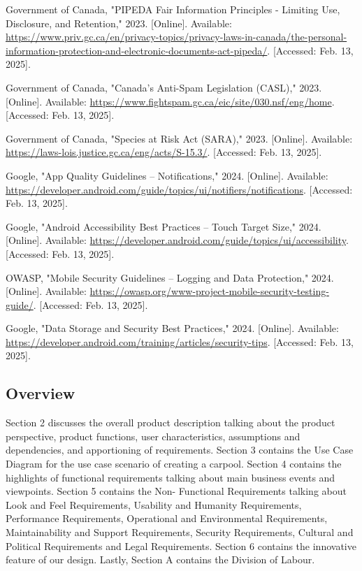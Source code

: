 \documentclass[]{article}
\begin{document}
\begin{thebibliography}{9}
     Government of Canada, "PIPEDA Fair Information Principles - Limiting Use, Disclosure, and Retention," 2023. [Online]. Available: \url{https://www.priv.gc.ca/en/privacy-topics/privacy-laws-in-canada/the-personal-information-protection-and-electronic-documents-act-pipeda/}. [Accessed: Feb. 13, 2025].

     Government of Canada, "Canada’s Anti-Spam Legislation (CASL)," 2023. [Online]. Available: \url{https://www.fightspam.gc.ca/eic/site/030.nsf/eng/home}. [Accessed: Feb. 13, 2025].

     Government of Canada, "Species at Risk Act (SARA)," 2023. [Online]. Available: \url{https://laws-lois.justice.gc.ca/eng/acts/S-15.3/}. [Accessed: Feb. 13, 2025].

     Google, "App Quality Guidelines – Notifications," 2024. [Online]. Available: \url{https://developer.android.com/guide/topics/ui/notifiers/notifications}. [Accessed: Feb. 13, 2025].

     Google, "Android Accessibility Best Practices – Touch Target Size," 2024. [Online]. Available: \url{https://developer.android.com/guide/topics/ui/accessibility}. [Accessed: Feb. 13, 2025].

     OWASP, "Mobile Security Guidelines – Logging and Data Protection," 2024. [Online]. Available: \url{https://owasp.org/www-project-mobile-security-testing-guide/}. [Accessed: Feb. 13, 2025].

     Google, "Data Storage and Security Best Practices," 2024. [Online]. Available: \url{https://developer.android.com/training/articles/security-tips}. [Accessed: Feb. 13, 2025].



\end{thebibliography}

\subsection{Overview}
\label{sub:overview}
Section 2 discusses the overall product description talking about the product perspective, product functions,
user characteristics, assumptions and dependencies, and apportioning of requirements. Section 3 contains
the Use Case Diagram for the use case scenario of creating a carpool. Section 4 contains the highlights of
functional requirements talking about main business events and viewpoints. Section 5 contains the Non-
Functional Requirements talking about Look and Feel Requirements, Usability and Humanity Requirements,
Performance Requirements, Operational and Environmental Requirements, Maintainability and Support
Requirements, Security Requirements, Cultural and Political Requirements and Legal Requirements. Section
6 contains the innovative feature of our design. Lastly, Section A contains the Division of Labour.
\end{document}
